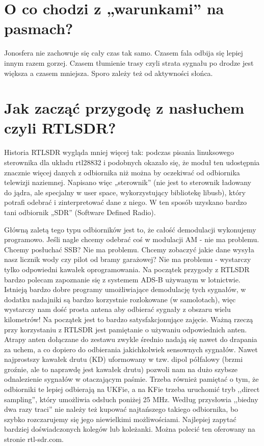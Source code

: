 \documentclass[a4paper,12pt]{article}
\begin{document}
\section{O co chodzi z „warunkami” na pasmach?}
Jonosfera nie zachowuje się cały czas tak samo. Czasem fala odbija się lepiej innym razem gorzej. Czasem tłumienie trasy czyli strata sygnału po drodze jest większa a czasem mniejsza. 
Sporo zależy też od aktywności słońca.

\section{Jak zacząć przygodę z nasłuchem czyli RTLSDR?}
Historia RTLSDR wygląda mniej więcej tak: podczas pisania linuksowego sterownika dla układu rtl28832 i podobnych okazało się, że moduł ten udostępnia znacznie więcej danych z odbiornika niż można by oczekiwać od odbiornika telewizji naziemnej. Napisano więc „sterownik” (nie jest to sterownik ładowany do jądra, ale specjalny w user space, wykorzystujący bibliotekę libusb), który potrafi odebrać i zinterpretować dane z niego. W ten sposób uzyskano bardzo tani odbiornik „SDR” (Software Defined Radio).

Główną zaletą tego typu odbiorników jest to, że całość demodulacji wykonujemy programowo. Jeśli nagle chcemy odebrać coś w modulacji AM - nie ma problemu. Chcemy posłuchać SSB? Nie ma problemu. Chcemy zobaczyć jakie dane wysyła nasz licznik wody czy pilot od bramy garażowej? Nie ma problemu - wystarczy tylko odpowiedni kawałek oprogramowania.
Na początek przygody z RTLSDR bardzo polecam zapoznanie się z systemem ADS-B używanym w lotnictwie. Istnieją bardzo dobre programy umożliwiające demodulację tych sygnałów, w dodatku nadajniki są bardzo korzystnie rozlokowane (w samolotach), więc wystarczy nam dość prosta antena aby odbierać sygnały z obszaru wielu kilometrów! Na początek jest to bardzo satysfakcjonujące zajęcie.
Ważną rzeczą przy korzystaniu z RTLSDR jest pamiętanie o używaniu odpowiednich anten. Atrapy anten dołączane do zestawu zwykle średnio nadają się nawet do drapania za uchem, a co dopiero do odbierania jakichkolwiek sensownych sygnałów. Nawet najprostszy kawałek drutu (KD) uformowany w tzw. dipol półfalowy (brzmi groźnie, ale to naprawdę jest kawałek drutu) pozwoli nam na dużo szybsze odnalezienie sygnałów w otaczającym paśmie.
Trzeba również pamiętać o tym, że odbiorniki te lepiej odbierają na UKFie, a na KFie trzeba uruchomić tryb ,,direct sampling'', który umożliwia odsłuch poniżej 25 MHz.
Według przysłowia ,,biedny dwa razy traci'' nie należy też kupować najtańszego takiego odbiornika, bo szybko rozczarujemy się jego niewielkimi możliwościami. Najlepiej zapytać bardziej doświadczonych kolegów lub koleżanki.
Można polecić ten oferowany na stronie rtl-sdr.com. 
\end{document}
